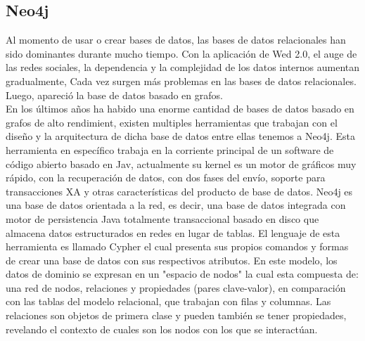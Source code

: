 \subsection{Neo4j}
Al momento de usar o crear bases de datos, las bases de datos relacionales han sido dominantes durante mucho tiempo.
Con la aplicación de Wed 2.0, el auge de las redes sociales, la dependencia y la complejidad de los datos internos aumentan gradualmente,
Cada vez surgen más problemas en las bases de datos relacionales. Luego,
apareció la base de datos basado en grafos.\\
En los últimos años ha habido una enorme cantidad de bases de datos basado en grafos de alto rendimient, existen multiples herramientas que trabajan con el diseño y la arquitectura de dicha base de datos entre ellas tenemos a Neo4j.
Esta herramienta en específico trabaja en la corriente principal de un software de código abierto basado en Jav, actualmente su kernel es un motor de gráficos muy rápido, con la recuperación de datos, con dos fases del envío, soporte para transacciones XA y otras características del producto de base de datos.
Neo4j es una base de datos orientada a la red, es decir, una base de datos integrada con motor de persistencia Java totalmente transaccional basado en disco que almacena datos estructurados en redes en lugar de tablas.
El lenguaje de esta herramienta es llamado Cypher el cual presenta sus propios comandos y formas de crear una base de datos con sus respectivos atributos.
En este modelo, los datos de dominio se expresan en un "espacio de nodos" la cual esta compuesta de: una red de nodos, relaciones y propiedades (pares clave-valor), en comparación con las tablas del modelo relacional, que trabajan con filas y columnas. Las relaciones son objetos de primera clase y pueden
también se tener  propiedades, revelando el contexto de cuales son los nodos con los que se interactúan. 
